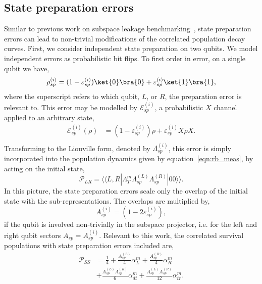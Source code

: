 \subsection{State preparation errors}\label{app:spam}
Similar to previous work on subspace leakage benchmarking~\cite{sutherland_subspace_2025}, state preparation errors can lead to non-trivial modifications of the correlated population decay curves. 
First, we consider independent state preparation on two qubits. We model independent errors as probabilistic bit flips. To first order in error, on a single qubit we have,
\begin{equation}
\label{eqn:state_prep}
\begin{split}
    \rho_{sp}^{(i)}&=(1-\varepsilon_{sp}^{(i)})\ket{0}\bra{0}+\varepsilon_{sp}^{(i)}\ket{1}\bra{1},\\
\end{split}
\end{equation}
where the superscript refers to which qubit, $L$, or $R$, the preparation error is relevant to.
This error may be modelled by $\mathcal{E}_{sp}^{(i)}$, a probabilistic $X$ channel applied to an arbitrary state,
\begin{equation}
\label{eqn:app_state_prep}
\begin{split}
    \mathcal{E}_{sp}^{(i)}(\rho)&=\left(1-\varepsilon_{sp}^{(i)}\right)\rho+\varepsilon_{sp}^{(i)}X\rho X.\\
\end{split}
\end{equation}
Transforming to the Liouville form, denoted by $\Lambda_{sp}^{(i)}$, this error is simply
incorporated into the population dynamics given by equation~\ref{eqn:rb_meas}, by acting on the initial state,
\begin{equation}
    \mathcal{P}_{LR}=\langle\langle L,R|\Lambda_T^m\Lambda_{sp}^{(L)}\Lambda_{sp}^{(R)}|00\rangle\rangle.
\end{equation}
In this picture, the state preparation errors scale only the overlap of the initial state with the sub-representations. 
The overlaps are multiplied by,
\begin{equation}
    A_{sp}^{(i)}=(1-2\varepsilon_{sp}^{(i)}),
\end{equation}
if the qubit is involved non-trivially in the subspace projector, i.e. for the left and right qubit sectors $A_{sp}=A_{sp}^{(i)}$.
Relevant to this work, the correlated survival populations with state preparation errors included are,
\begin{equation}
\label{eqn:app_pop_sp}
\begin{split}
    \mathcal{P}_{SS} &=  \frac{1}{4}+\frac{A_{sp}^{(L)}}{4}\alpha_L^m+\frac{A_{sp}^{(R)}}{4}\alpha_R^m \\
    &+ \frac{A_{sp}^{(L)}A_{sp}^{(R)}}{6}\alpha_{dt}^m+\frac{A_{sp}^{(L)}A_{sp}^{(R)}}{12}\alpha_{tr}^m.
\end{split}
\end{equation}
